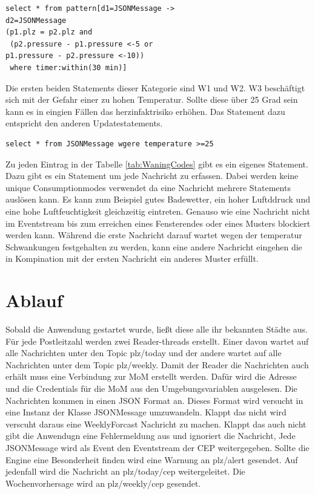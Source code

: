 \begin{lstlisting}
select * from pattern[d1=JSONMessage ->
d2=JSONMessage
(p1.plz = p2.plz and
 (p2.pressure - p1.pressure <-5 or 
p1.pressure - p2.pressure <-10))
 where timer:within(30 min)]
\end{lstlisting} 
Die ersten beiden Statements dieser Kategorie sind W1 und W2. W3 beschäftigt sich mit der Gefahr einer zu hohen Temperatur. Sollte diese über 25 Grad sein kann es in eingien Fällen das herzinfaktrisiko erhöhen. Das Statement dazu entspricht den anderen Updatestatements. 

\begin{lstlisting}
select * from JSONMessage wgere temperature >=25
\end{lstlisting}
 Zu jeden Eintrag in der Tabelle \ref{tab:WaningCodes} gibt es ein eigenes Statement. Dazu gibt es ein Statement um jede Nachricht zu erfassen. Dabei werden keine unique Consumptionmodes verwendet da eine Nachricht mehrere Statements auslösen kann. Es kann zum Beispiel gutes Badewetter, ein hoher Luftddruck und eine hohe Luftfeuchtigkeit gleichzeitig eintreten. Genauso wie eine Nachricht nicht im Eventstream bis zum erreichen eines Fensterendes oder eines Musters blockiert werden kann. Während die erste Nachricht darauf wartet wegen der temperatur Schwankungen festgehalten zu werden, kann eine andere Nachricht eingehen die in Kompination mit der ersten Nachricht ein anderes Muster erfüllt.  
\section{Ablauf}
Sobald die Anwendung gestartet wurde, ließt diese alle ihr bekannten Städte aus. Für jede Postleitzahl werden zwei Reader-threads erstellt. Einer davon wartet auf alle Nachrichten unter den Topic plz/today und der andere wartet auf alle Nachrichten unter dem Topic plz/weekly. Damit der Reader die Nachrichten auch erhält muss eine Verbindung zur MoM erstellt werden. Dafür wird die Adresse und die Credentials für die MoM aus den Umgebungsvariablen ausgelesen. Die Nachrichten kommen in einen JSON Format an. Dieses Format wird versucht in eine Instanz der Klasse JSONMessage umzuwandeln. Klappt das nicht wird verscuht daraus eine WeeklyForcast Nachricht zu machen. Klappt das auch nicht gibt die Anwendugn eine Fehlermeldung aus und ignoriert die Nachricht, Jede JSONMessage wird als Event den Eventstream der CEP weitergegeben. Sollte die Engine eine Besonderheit finden wird eine Warnung an plz/alert gesendet. Auf jedenfall wird die Nachricht an plz/today/cep weitergeleitet. Die Wochenvorhersage wird an plz/weekly/cep gesendet.  
